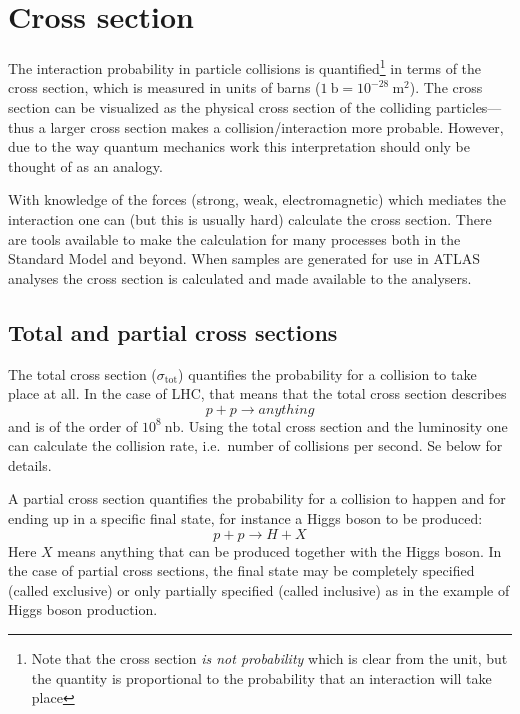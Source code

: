 \section{Cross section}
The interaction probability in particle collisions is quantified\footnote{Note that the cross section \emph{is not probability} which is clear from the unit, but the quantity is proportional to the probability that an interaction will take place} in terms of the cross section, which is measured in units of barns ($1~\mathrm{b} = 10^{-28}~\mathrm{m^2}$). The cross section can be visualized as the physical cross section of the colliding particles---thus a larger cross section makes a collision/interaction more probable. However, due to the way quantum mechanics work this interpretation should only be thought of as an analogy.

With knowledge of the forces (strong, weak, electromagnetic) which mediates the interaction one can (but this is usually hard) calculate the cross section. There are tools available to make the calculation for many processes both in the Standard Model and beyond. When samples are generated for use in ATLAS analyses the cross section is calculated and made available to the analysers.

\subsection{Total and partial cross sections}
The total cross section ($\sigma_\text{tot}$) quantifies the probability for a collision to take place at all. In the case of LHC, that means that the total cross section describes
\begin{displaymath}
	p + p \to anything
\end{displaymath}
and is of the order of $10^8~\mathrm{nb}$. Using the total cross section and the luminosity one can calculate the collision rate, i.e.~number of collisions per second. Se below for details.

A partial cross section quantifies the probability for a collision to happen and for ending up in a specific final state, for instance a Higgs boson to be produced:
\begin{displaymath}
	p + p \to H + X
\end{displaymath}
Here $X$ means anything that can be produced together with the Higgs boson. In the case of partial cross sections, the final state may be completely specified (called exclusive) or only partially specified (called inclusive) as in the example of Higgs boson production. 

